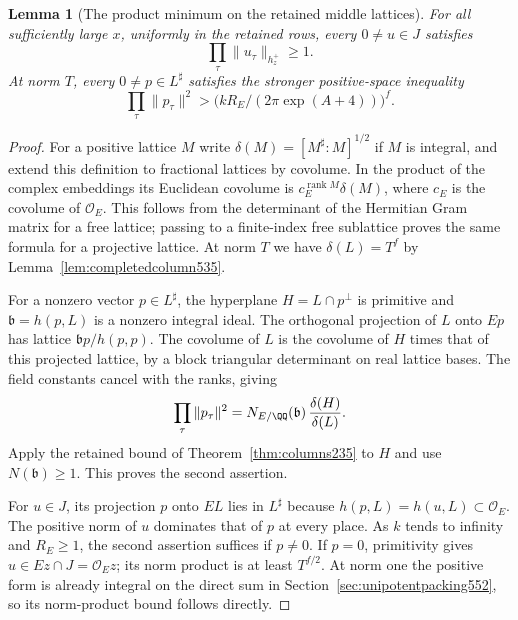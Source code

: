 \documentclass[a4paper,11pt]{article}
\newtheorem{lemma}[proposition]{Lemma}
\theoremstyle{definition}
\theoremstyle{remark}
\numberwithin{equation}{section}
\begin{document}
\begin{lemma}[The product minimum on the retained middle lattices]
\leavevmode\label{lem:middleminimum553}
For all sufficiently large \(x\), uniformly in the retained rows,
every \(0\ne u\in J\) satisfies
\[
                   \prod_\tau\|u_\tau\|_{h_z^+}\ge1 .
\]
At norm \(T\), every \(0\ne p\in L^\sharp\) satisfies the
stronger positive-space inequality
\[
       \prod_\tau\|p_\tau\|^2>
                    \bigl(kR_E/(2\pi\exp(A+4))\bigr)^f .
\]
\end{lemma}
\begin{proof}
For a positive lattice \(M\) write
\(\delta(M)=[M^\sharp:M]^{1/2}\) if \(M\) is integral, and
extend this definition to fractional lattices by covolume.
In the product of the complex embeddings its Euclidean
covolume is \(c_E^{\operatorname{rank}M}\delta(M)\), where
\(c_E\) is the covolume of \(\mathcal O_E\). This follows from
the determinant of the Hermitian Gram matrix for a free lattice;
passing to a finite-index free sublattice proves the same
formula for a projective lattice. At norm \(T\) we have
\(\delta(L)=T^f\) by Lemma~\ref{lem:completedcolumn535}.

For a nonzero vector \(p\in L^\sharp\), the hyperplane
\(H=L\cap p^\perp\) is primitive and
\(\mathfrak b=h(p,L)\) is a nonzero integral ideal. The
orthogonal projection of \(L\) onto \(Ep\) has lattice
\(\mathfrak b p/h(p,p)\). The covolume of \(L\) is the
covolume of \(H\) times that of this projected lattice, by a
block triangular determinant on real lattice bases. The field
constants cancel with the ranks, giving
\[
       \prod_\tau\|p_\tau\|^2
          = N_{E/\QQ}(\mathfrak b)\,\frac{\delta(H)}{\delta(L)} .
\]
Apply the retained bound of Theorem~\ref{thm:columns235} to
\(H\) and use \(N(\mathfrak b)\ge1\). This proves the second
assertion.

For \(u\in J\), its projection \(p\) onto \(EL\) lies in
\(L^\sharp\) because \(h(p,L)=h(u,L)\subset\mathcal O_E\).
The positive norm of \(u\) dominates that of \(p\) at every
place. As \(k\) tends to infinity and \(R_E\ge1\), the second
assertion suffices if \(p\ne0\). If \(p=0\), primitivity gives
\(u\in Ez\cap J=\mathcal O_Ez\); its norm product is at least
\(T^{f/2}\). At norm one the positive form is already integral
on the direct sum in Section~\ref{sec:unipotentpacking552},
so its norm-product bound follows directly.
\end{proof}
\end{document}
